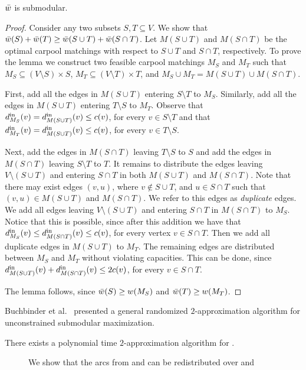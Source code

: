 \begin{lemma}
$\barw$ is submodular.
\end{lemma}
\begin{proof}
Consider any two subsets $S, T \subseteq V$.  We show that $\barw(S)
+ \barw(T) \geq \barw(S \cup T) + \barw(S \cap T)$.
%
Let $M(S \cup T)$ and $M(S \cap T)$ be the optimal carpool matchings
with respect to $S \cup T$ and $S \cap T$, respectively.
%
To prove the lemma we construct two feasible carpool matchings $M_S$
and $M_T$ such that $M_S \subseteq (V \setminus S) \times S$,
$M_T \subseteq (V \setminus T) \times T$, and $M_S \cup M_T = M(S \cup
T) \cup M(S \cap T)$.

First, add all the edges in $M(S \cup T)$ entering $S \setminus T$ to
$M_S$.  Similarly, add all the edges in $M(S \cup T)$ entering
$T \setminus S$ to $M_T$.  Observe that $\din[M_S](v) = \din[M(S \cup
T)](v) \leq c(v)$, for every $v \in S \setminus T$ and that
$\din[M_T](v) = \din[M(S \cup T)](v) \leq c(v)$, for every $v \in
T \setminus S$.

Next, add the edges in $M(S \cap T)$ leaving $T \setminus S$ to $S$
and add the edges in $M(S \cap T)$ leaving $S \setminus T$ to $T$.
%
It remains to distribute the edges leaving $V \setminus (S \cup T)$
and entering $S \cap T$ in both $M(S \cup T)$ and $M(S \cap T)$.  Note
that there may exist edges $(v,u)$, where $v \not\in S \cup T$, and
$u \in S \cap T$ such that $(v,u) \in M(S \cup T)$ and $M(S \cap T)$.
We refer to this edges as \emph{duplicate} edges.
%
We add all edges leaving $V \setminus (S \cup T)$ and entering $S \cap
T$ in $M(S \cap T)$ to $M_S$.  Notice that this is possible, since
after this addition we have that $\din[M_S](v) \leq \din[M(S \cap
T)](v) \leq c(v)$, for every vertex $v \in S \cap T$.
%
Then we add all duplicate edges in $M(S \cup T)$ to $M_T$.
%
The remaining edges are distributed between $M_S$ and $M_T$ without
violating capacities.  This can be done, since $\din[M(S \cup T)](v)
+ \din[M(S \cap T)](v) \leq 2c(v)$, for every $v \in S \cap T$.

The lemma follows, since $\barw(S) \geq w(M_S)$ and $\barw(T) \geq
w(M_T)$.
\end{proof}

Buchbinder et al.~\cite{BFNS15,buchbinder2016deterministic} presented a
general randomized $2$-approximation algorithm for unconstrained submodular maximization.

\begin{theorem}
There exists a polynomial time $2$-approximation algorithm for \carpool.
\end{theorem}

\begin{figure}
\centering

\caption[]{
\label{fig:defs}
We show that the arcs from  and  can be
redistributed over  and  
}
\end{figure}
